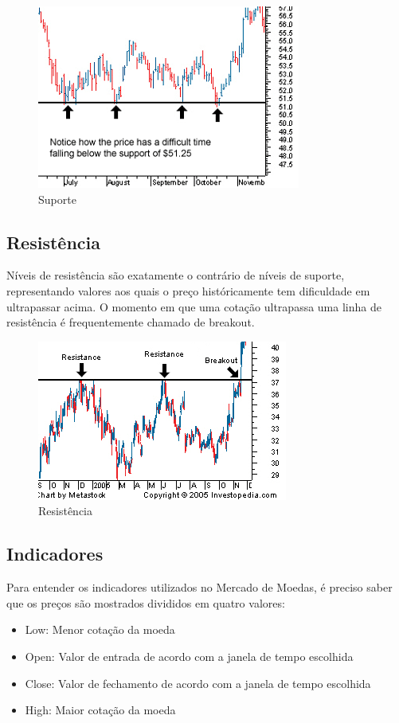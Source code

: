\begin{figure}[h]
	\centering
	\includegraphics[keepaspectratio=true,scale=1]{figuras/sup.png}
	\caption{Suporte}
	\label{fig03}
\end{figure}

\subsection{Resistência}

Níveis de resistência são exatamente o contrário de níveis de suporte, representando valores aos quais o preço históricamente tem dificuldade
em ultrapassar acima. O momento em que uma cotação ultrapassa uma linha de resistência é frequentemente chamado de breakout.

\begin{figure}[h]
	\centering
	\includegraphics[keepaspectratio=true,scale=1]{figuras/resist.png}
	\caption{Resistência}
	\label{fig04}
\end{figure}

\subsection{Indicadores}

Para entender os indicadores utilizados no Mercado de Moedas, é preciso saber que os preços são mostrados divididos em quatro valores:
\begin{itemize}
  \item Low: Menor cotação da moeda
  \item Open: Valor de entrada de acordo com a janela de tempo escolhida
  \item Close: Valor de fechamento de acordo com a janela de tempo escolhida
  \item High: Maior cotação da moeda
\end{itemize}

